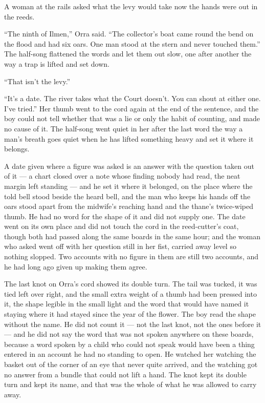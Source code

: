 A woman at the rails asked what the levy would take now the hands were out in the reeds.

“The ninth of Ilmen,” Orra said. “The collector's boat came round the bend on the flood and had six oars. One man stood at the stern and never touched them.” The half-song flattened the words and let them out slow, one after another the way a trap is lifted and set down.

“That isn't the levy.”

“It's a date. The river takes what the Court doesn't. You can shout at either one. I've tried.” Her thumb went to the cord again at the end of the sentence, and the boy could not tell whether that was a lie or only the habit of counting, and made no cause of it. The half-song went quiet in her after the last word the way a man's breath goes quiet when he has lifted something heavy and set it where it belongs.

A date given where a figure was asked is an answer with the question taken out of it --- a chart closed over a note whose finding nobody had read, the neat margin left standing --- and he set it where it belonged, on the place where the told bell stood beside the heard bell, and the man who keeps his hands off the oars stood apart from the midwife's reaching hand and the thane's twice-wiped thumb. He had no  word for the shape of it and did not supply one. The date went on its own place and did not touch the cord in the reed-cutter's coat, though both had passed along the same boards in the same hour; and the woman who asked went off with her question still in her fist, carried away level so nothing slopped. Two accounts with no figure in them are still two accounts, and he had long ago given up making them agree.

The last knot on Orra's cord showed its double turn. The tail was tucked, it was tied left over right, and the small extra weight of a thumb had been pressed into it, the shape legible in the small light and the word that would have named it staying where it had stayed since the year of the flower. The boy read the shape without the name. He did not count it --- not the last knot, not the ones before it --- and he did not say the word that was not spoken anywhere on these boards, because a word spoken by a child who could not speak would have been a thing entered in an account he had no standing to open. He watched her watching the basket out of the corner of an eye that never quite arrived, and the watching got no answer from a bundle that could not lift a hand. The knot kept its double turn and kept its name, and that was the whole of what he was allowed to carry away.

